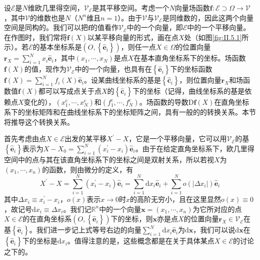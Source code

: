 \documentclass[../main.tex]{subfiles}
\begin{document}
设$\mathcal{E}$是$N$维欧几里得空间，$\mathcal{V}_\mathcal{E}$是其平移空间。考虑一个$N$向量场函数$\mathbf{f}:\mathcal{E}\supset\Omega\rightarrow\mathcal{V}$，其中$\mathcal{V}$的维数也是$N$（$N^n$维且$n=1$）。由于$\mathcal{V}$与$\mathcal{V}_\mathcal{E}$是同维数的，因此这两个向量空间是同构的。我们可以把$\mathbf{f}$的值看作$\mathcal{V}_\mathcal{E}$中的一个向量，即$\mathcal{E}$中的一个平移向量。在作图时，我们常将$\mathbf{f}\left(X\right)$以某平移向量的形式，画在点$X$处（如图\ref{fig:II.5.1}所示）。若$\mathcal{E}$的基本坐标系是$\left(O,\left\{\mathbf{\hat{e}}_i\right\}\right)$，则任一点$X\in\Omega$的位置向量$\mathbf{r}_X=\sum_{i=1}^N x_i \mathbf{\hat{e}}_i$，其中$\left(x_1,\cdots,x_N\right)$是点$X$在基本直角坐标系下的坐标。场函数$\mathbf{f}\left(X\right)$的值，现作为$\mathcal{V}_\mathcal{E}$中的一个向量，也具有在$\left\{\mathbf{\hat{e}}_i\right\}$下的坐标函数$\mathbf{f}\left(X\right)=\sum_{i=1}^N f_i \left(X\right) \mathbf{\hat{e}}_i$。设某曲线坐标系的基是$\left\{\mathbf{\hat{c}}_i\right\}$，则位置向量$\mathbf{r}_X$和场函数值$\mathbf{f}\left(X\right)$都可以写成点关于点$X$的$\left\{\mathbf{\hat{c}}_i\right\}$下的坐标（记得，曲线坐标系的基是依赖点$X$变化的），$\left(x_1^\mathrm{c},\cdots,x_N^\mathrm{c}\right)$和$\left(f_1^\mathrm{c},\cdots,f_N^\mathrm{c}\right)$。场函数的导数$\mathrm{D}\mathbf{f}\left(X\right)$在直角坐标系下的坐标矩阵和在曲线坐标系下的坐标矩阵之间，具有一般的的转换关系。本节将推导这个转换关系。

首先考虑由点$X\in\mathcal{E}$出发的某平移$X^\prime-X$，它是一个平移向量，它可以用$\mathcal{V}_\mathcal{E}$的基$\left\{\mathbf{\hat{e}}_i\right\}$表示为$X-X_0=\sum_{i=1}^N\left(x_i^\prime-x_i\right)\mathbf{\hat{e}}_i$。由于在给定直角坐标系下，欧几里得空间中的点与其在该直角坐标系下的坐标之间是双射关系，所以若视$X$为$\left(x_1,\cdots,x_n\right)$的函数，则由微分的定义，有
\[X^\prime-X=\sum_{i=1}^N\left(x_i^\prime-x_i\right)\mathbf{\hat{e}}_i=\sum_{i=1}^N \mathrm{d}x_i\mathbf{\hat{e}}_i+\sum_{i=1}^No\left(\left|\Delta x_i\right|\right)\mathbf{\hat{e}}_i\]
其中$\Delta x_i\equiv x_i^\prime-x_i$，$o\left(x\right)$表示$x\rightarrow 0$时$x$的高阶无穷小，且在这里显然$o\left(x\right)\equiv 0$，故记号$\mathrm{d}x_i \equiv \Delta x_i$。我们记$\mathbb{R}^n$中的一个向量$\mathbf{x}=\left(x_1,\cdots,x_n\right)$为它所对应的点$X\in\mathcal{E}$的在直角坐标系$\left(O,\left\{\mathbf{\hat{e}}_i\right\}\right)$下的坐标，则$\mathbf{x}$亦是点$X$的位置向量$\mathbf{r}_X\in\mathcal{V}_\mathcal{E}$在基$\left\{\mathbf{\hat{e}}_i\right\}$。我们进一步记上式等号右边的向量$\sum_{i=1}^N\mathrm{d}x_i\mathbf{\hat{e}}_i$为$\mathrm{d}\mathbf{x}$，我们可以说$\mathrm{d}\mathbf{x}$在$\left\{\mathbf{\hat{e}}_i\right\}$下的坐标是$\mathrm{d}x_i$。值得注意的是，这些概念都是在关于具体某点$X\in\mathcal{E}$的讨论之下的。
\end{document}
